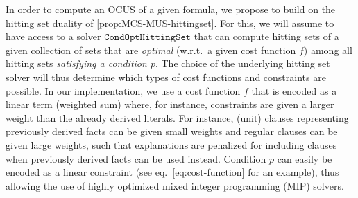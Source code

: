 \documentclass[a4paper,UKenglish,cleveref, autoref, thm-restate, pdfa]{lipics-v2021}
\renewcommand\comment[1]{}
\newcommand{\emilio}[1]{{\comment{\color{red}Emilio: #1}}}
\newcommand{\bart}[1]{{\comment{\color{OliveGreen}Bart: #1}}}
\newcommand\mm[1]{\ensuremath{#1}\xspace}
\newcommand\call[1]{\mm{\texttt{#1}}}
\newcommand\cohs{\mm{\call{CondOptHittingSet}}}
\begin{document}
	In order to compute an OCUS of a given formula, we propose to build on the hitting set duality of \cref{prop:MCS-MUS-hittingset}. 
	For this, we will assume to have access to a solver \cohs that can compute hitting sets of a given collection of sets that are \emph{optimal} (w.r.t.\ a given cost function $f$) among all hitting sets \emph{satisfying a condition $p$}. 
	The choice of the underlying hitting set solver will thus determine which types of cost functions and constraints are possible. 
	In our implementation, we use a cost function $f$ that is encoded as a linear term (weighted sum) where, for instance, constraints are given a larger weight than the already derived literals. 
	For instance, (unit) clauses representing previously derived facts can be given small weights and regular clauses can be given large weights, such that explanations are penalized for including clauses when previously derived facts can be used instead. %
	Condition $p$ can easily be encoded as a linear constraint (see eq.~\ref{eq:cost-function} for an example), 
	thus allowing the use of highly optimized mixed integer programming (MIP) solvers. 
	\bart{In my opinion, we should FIRST say what the variables are and THEN that we write a linear term over themm for f for instance. }
	\emilio{Is this what you mean ?}
	
\end{document}
